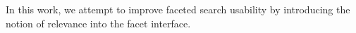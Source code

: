 In this work, we attempt to improve faceted search usability by introducing the
notion of relevance into the facet interface.  

% 

